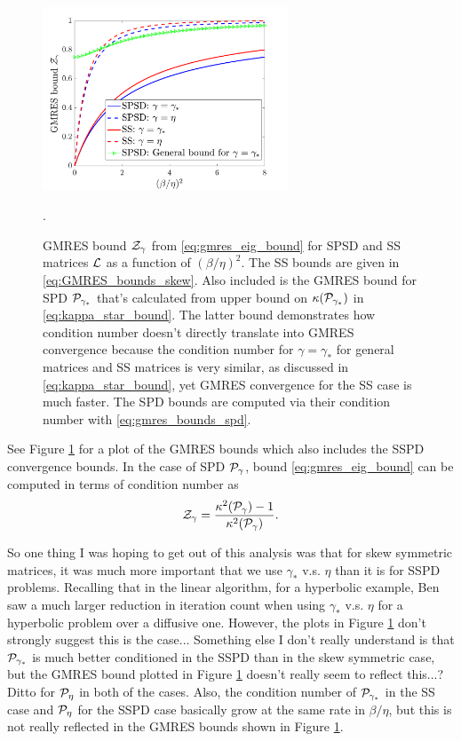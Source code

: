 \documentclass[a4paper,10pt]{article}
\begin{document}
{\begin{itemize}
\begin{figure}[!htb]
\label{fig:gmres_bounds}
\centering
\includegraphics[width=0.65\textwidth]{figures/gmres_bounds_spsd_ss}
\caption{GMRES bound ${\cal Z}_{\gamma}$ from \eqref{eq:gmres_eig_bound} for SPSD and SS matrices ${\cal L}$ as a function of $(\beta/\eta)^2$. The SS bounds are given in \eqref{eq:GMRES_bounds_skew}. Also included is the GMRES bound for SPD ${\cal P}_{\gamma_*}$ that's calculated from upper bound on $\kappa({\cal P}_{\gamma_*})$ in \eqref{eq:kappa_star_bound}. The latter bound demonstrates how condition number doesn't directly translate into GMRES convergence because the condition number for $\gamma = \gamma_*$ for general matrices and SS matrices is very similar, as discussed in \eqref{eq:kappa_star_bound}, yet GMRES convergence for the SS case is much faster. The SPD bounds are computed via their condition number with \eqref{eq:gmres_bounds_spd}.}.
\end{figure}

See Figure \ref{fig:gmres_bounds} for a plot of the GMRES bounds which also includes the SSPD convergence bounds. In the case of SPD ${\cal P}_{\gamma}$, bound \eqref{eq:gmres_eig_bound} can be computed in terms of condition number as 
\begin{align}
\label{eq:gmres_bounds_spd}
{\cal Z}_{\gamma} = \frac{\kappa^2({\cal P}_{\gamma}) - 1}{\kappa^2({\cal P}_{\gamma})}.
\end{align}



So one thing I was hoping to get out of this analysis was that for skew symmetric matrices, it was much more important that we use $\gamma_*$ v.s. $\eta$ than it is for SSPD problems. Recalling that in the linear algorithm, for a hyperbolic example, Ben saw a much larger reduction in iteration count when using $\gamma_*$ v.s. $\eta$ for a hyperbolic problem over a diffusive one. However, the plots in Figure \ref{fig:gmres_bounds} don't strongly suggest this is the case...
Something else I don't really understand is that ${\cal P}_{\gamma_*}$ is much better conditioned in the SSPD than in the skew symmetric case, but the GMRES bound plotted in Figure \ref{fig:gmres_bounds} doesn't really seem to reflect this...? Ditto for ${\cal P}_{\eta}$ in both of the cases. Also, the condition number of ${\cal P}_{\gamma_*}$ in the SS case and ${\cal P}_{\eta}$ for the SSPD case basically grow at the same rate in $\beta/\eta$, but this is not really reflected in the GMRES bounds shown in Figure \ref{fig:gmres_bounds}.


\end{itemize}}
\end{document}
